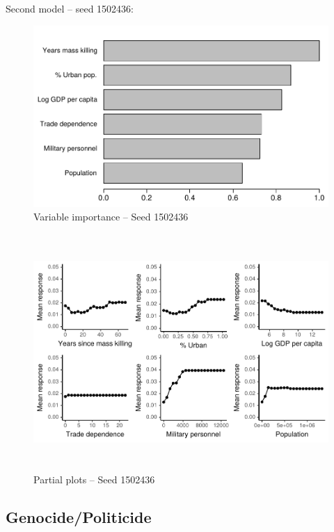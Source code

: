 \newpage

Second model -- seed 1502436: 

\begin{figure}[H]
    \centering
    \includegraphics{images/drf-mk3.pdf}
    \caption{Variable importance -- Seed 1502436}
    \label{fig:my_label}
\end{figure}

\begin{figure}[H]
    \centering
    \includegraphics[width=\textwidth, height=9cm]{images/drfdpp3a.pdf}
    \caption{Partial plots -- Seed 1502436}
    \label{fig:my_label}
\end{figure}

\newpage

\subsection{Genocide/Politicide}
\label{sec:mk-other-variable}

